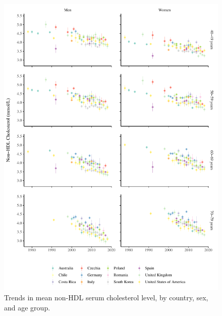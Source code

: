 \documentclass[12pt]{article}
\begin{document}
\begin{figure}[hp]
 \centering
 \includegraphics[width=\textwidth]{../3_figures/fig1_mean_chol.pdf}
 \caption{Trends in mean non-HDL serum cholesterol level, by country, sex, and age group.}
 \label{fig:mean_chol}
\end{figure}
\end{document}

